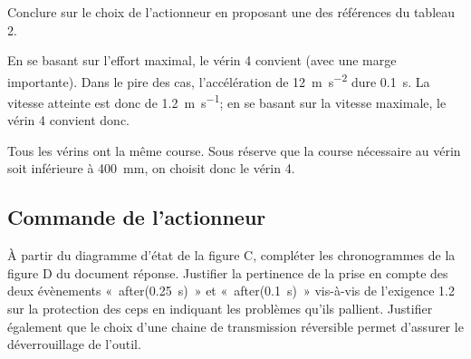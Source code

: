 \documentclass[11pt]{article}
\begin{document}
\UPSTIquestion  Conclure sur le choix de l'actionneur en proposant une des références du tableau 2.

\begin{UPSTIcorrige}
En se basant sur l'effort maximal, le vérin 4 convient (avec une marge importante).  Dans le pire des cas, l'accélération de \SI{12}{m.s^{-2}} dure \SI{0,1}{s}. La vitesse atteinte est donc de \SI{1,2}{m.s^{-1}}; en se basant sur la vitesse maximale, le vérin 4 convient donc. 

Tous les vérins ont la même course. Sous réserve que la course nécessaire au vérin soit inférieure à \SI{400}{mm}, on choisit donc le vérin 4. 
\end{UPSTIcorrige}

\subsection{Commande de l’actionneur}

\UPSTIquestion  À partir du diagramme d’état de la figure C, compléter les chronogrammes de la figure D du document réponse. Justifier la pertinence de la prise en compte des deux évènements «~after(\SI{0,25}{s})~» et «~after(\SI{0,1}{s})~» vis-à-vis de l’exigence 1.2 sur la protection des ceps en indiquant les problèmes qu’ils pallient. Justifier également que le choix d’une chaine de transmission réversible permet d’assurer le déverrouillage de l’outil.
\end{document}
